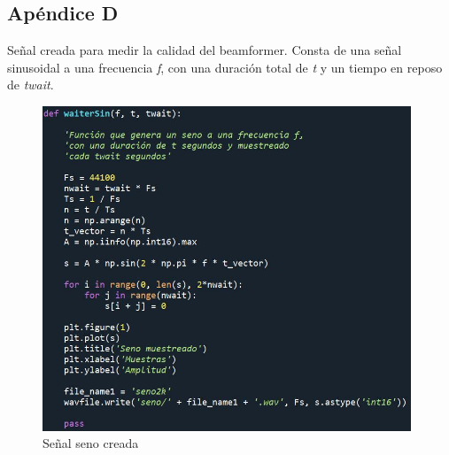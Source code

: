 \documentclass[a4paper,11pt]{book}
\begin{document}
\section{Apéndice D}
Señal creada para medir la calidad del beamformer. Consta de una señal sinusoidal a una frecuencia \textit{f}, con una duración total de \textit{t} y un tiempo en reposo de \textit{twait}.
\begin{figure}[hbtp]
\centering
\includegraphics[width = 11cm]{FIGURAS/seno_muestreado.JPG}
\caption{Señal seno creada}
\end{figure}







%
%
%
%
%
%
%
%
%
%
%
%
%
%
%
%
%
%
%
%
%
%
\chapter*{}
\thispagestyle{empty}
\end{document}
